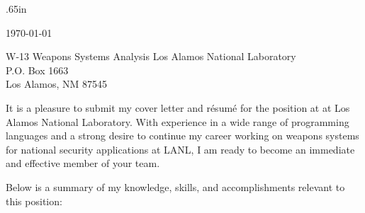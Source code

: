 \documentclass[a4paper,10pt]{article}
\begin{document}
\pagestyle{empty} 		%
\sloppy 			%


\vspace{5mm}


  \normalsize
  
  \begingroup
  \leftskip.65in
  \rightskip\leftskip

  \vspace{4mm} 
  \today \\
  \vspace{2mm}

W-13 Weapons Systems Analysis
Los Alamos National Laboratory \\
P.O. Box 1663 \\
Los Alamos, NM 87545
  
  \vspace{4mm} 

It is a pleasure to submit my cover letter and r\'{e}sum\'{e} for the position
at
at Los Alamos National Laboratory.
With experience in a wide range of programming languages and a strong desire to continue my career working on weapons systems for national security applications at LANL, I am ready to become an immediate and effective member of your team.

\vspace{2mm}
Below is a summary of my knowledge, skills, and accomplishments relevant to this position: \vspace{1mm}
\end{document}
